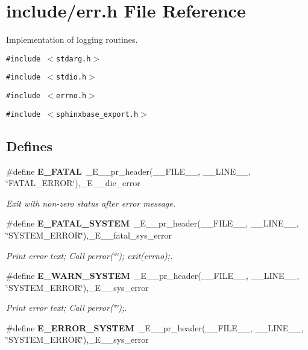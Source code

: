 \section{include/err.h File Reference}
\label{err_8h}
Implementation of logging routines.  


{\tt \#include $<$stdarg.h$>$}\par
{\tt \#include $<$stdio.h$>$}\par
{\tt \#include $<$errno.h$>$}\par
{\tt \#include $<$sphinxbase\_\-export.h$>$}\par
\subsection*{Defines}
\begin{CompactItemize}
\item 
\#define {\bf E\_\-FATAL}~\_\-E\_\-\_\-pr\_\-header(\_\-\_\-FILE\_\-\_\-, \_\-\_\-LINE\_\-\_\-, \char`\"{}FATAL\_\-ERROR\char`\"{}),\_\-E\_\-\_\-die\_\-error\label{err_8h_1a4495946ab2449d61108fe829a94613}

\begin{CompactList}\small\item\em Exit with non-zero status after error message. \item\end{CompactList}\item 
\#define {\bf E\_\-FATAL\_\-SYSTEM}~\_\-E\_\-\_\-pr\_\-header(\_\-\_\-FILE\_\-\_\-, \_\-\_\-LINE\_\-\_\-, \char`\"{}SYSTEM\_\-ERROR\char`\"{}),\_\-E\_\-\_\-fatal\_\-sys\_\-error\label{err_8h_5229a1d58f5f5e69963a8d038ff5bc3e}

\begin{CompactList}\small\item\em Print error text; Call perror(\char`\"{}\char`\"{}); exit(errno);. \item\end{CompactList}\item 
\#define {\bf E\_\-WARN\_\-SYSTEM}~\_\-E\_\-\_\-pr\_\-header(\_\-\_\-FILE\_\-\_\-, \_\-\_\-LINE\_\-\_\-, \char`\"{}SYSTEM\_\-ERROR\char`\"{}),\_\-E\_\-\_\-sys\_\-error\label{err_8h_63de511eaca101291914f701e67c5c44}

\begin{CompactList}\small\item\em Print error text; Call perror(\char`\"{}\char`\"{});. \item\end{CompactList}\item 
\#define {\bf E\_\-ERROR\_\-SYSTEM}~\_\-E\_\-\_\-pr\_\-header(\_\-\_\-FILE\_\-\_\-, \_\-\_\-LINE\_\-\_\-, \char`\"{}SYSTEM\_\-ERROR\char`\"{}),\_\-E\_\-\_\-sys\_\-error\label{err_8h_54ffbfe898d74595c586a1f48f32ef03}


\end{CompactItemize}
